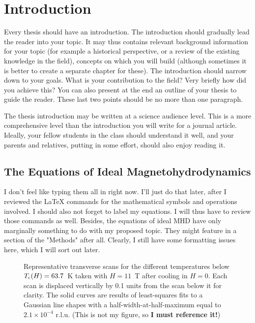 \documentclass[10pt]{ucscthesisbs}
\begin{document}

\chapter{Introduction}

Every thesis should have an introduction.  The introduction should gradually lead the reader
into your topic. It may thus contains relevant background information for your topic (for example a historical perspective, or a review of the existing knowledge in the field), concepts on which you will build (although sometimes it is better to create a separate chapter for these). The introduction should narrow down to your goals. What is your contribution to the field? Very briefly how did you achieve this? You can also present at the end an outline of your thesis to guide the reader. These last two points should be no more than one paragraph.

The thesis introduction may be written at a science audience level. This is a more comprehensive level than the introduction you will write for a journal article. Ideally, your fellow students in the class should understand it well, and your parents and relatives, putting in some effort, should also enjoy reading it. 


\section{The Equations of Ideal Magnetohydrodynamics}

I don't feel like typing them all in right now. I'll just do that later, after I reviewed the
LaTeX commands for the mathematical symbols and operations involved. I should also not forget to label my equations. I will thus have to review those commands as well. Besides, the equations
of ideal MHD have only marginally something to do with my proposed topic. They might feature
in a section of the "Methods" after all. Clearly, I still have some formatting issues here, which I will sort out later.

\begin{figure}[t!]
 \centerline{
  \epsfxsize=3.8in
 }
\caption[Transverse Scans at difference Temperatures at $H=11$~T]
{Representative transverse scans for the different temperatures
below $T_{\rm c}(H) = 63.7$~K taken with
$H=11$~T after cooling in $H=0$. Each scan is displaced vertically by 0.1 units
from the scan below it for clarity.  The solid curves
are results of least-squares fits to
a Gaussian line shapes with a half-width-at-half-maximum
equal to $2.1\times10^{-4}$ r.l.u.
(This is not my figure, so {\bf I must reference it!})}
\label{fig:discretescan}
\end{figure}
\end{document}
